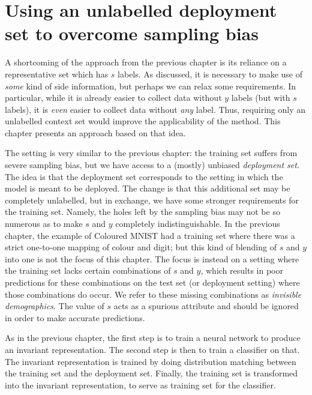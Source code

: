 \section{Using an unlabelled deployment set to overcome sam\-p\-ling bias}\label{sec:zsf}
A shortcoming of the approach from the previous chapter
is its reliance on a representative set which has \(s\) labels.
As discussed, it is necessary to make use of \emph{some} kind of side information,
but perhaps we can relax some requirements.
In particular, while it is already easier to collect data without \(y\) labels (but with \(s\) labels),
it is \emph{even} easier to collect data without \emph{any} label.
Thus, requiring only an unlabelled context set would improve the applicability of the method.
This chapter presents an approach based on that idea.

The setting is very similar to the previous chapter:
the training set suffers from severe sampling bias, but we have access to a (mostly) unbiased \emph{deployment set}.
The idea is that the deployment set corresponds to the setting in which the model is meant to be deployed.
The change is that this additional set may be completely unlabelled,
but in exchange, we have some stronger requirements for the training set.
Namely, the holes left by the sampling bias may not be so numerous
as to make \(s\) and \(y\) completely indistinguishable.
In the previous chapter, the example of Coloured MNIST had a training set
where there was a strict one-to-one mapping of colour and digit;
but this kind of blending of \(s\) and \(y\) into one is not the focus of this chapter.
The focus is instead on a setting where the training set lacks certain combinations of \(s\) and \(y\),
which results in poor predictions for these combinations on the test set (or deployment setting)
where those combinations do occur.
We refer to these missing combinations as \emph{invisible demographics}.
The value of \(s\) acts as a spurious attribute and should be ignored in order to make accurate predictions.

As in the previous chapter, the first step is to train a neural network to produce an invariant representation.
The second step is then to train a classifier on that.
The invariant representation is trained by doing distribution matching between the training set and the deployment set.
Finally, the training set is transformed into the invariant representation,
to serve as training set for the classifier.

